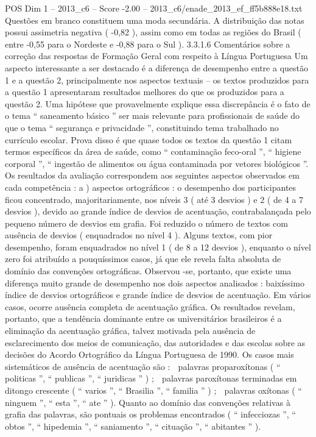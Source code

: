 \begin{textsample}{POS Dim 1 – 2013\_c6 – Score -2.00 – 2013\_c6/enade\_2013\_ef\_ff5b888e18.txt}
Questões em branco constituem uma moda secundária.
A distribuição das notas possui assimetria negativa ( -0,82 ), assim como em todas as regiões do Brasil ( entre -0,55 para o Nordeste e -0,88 para o Sul ). 3.3.1.6 Comentários sobre a correção das respostas de Formação Geral com respeito à Língua Portuguesa Um aspecto interessante a ser destacado é a diferença de desempenho entre a questão 1 e a questão 2, principalmente nos aspectos textuais – os textos produzidos para a questão 1 apresentaram resultados melhores do que os produzidos para a questão 2.
Uma hipótese que provavelmente explique essa discrepância é o fato de o tema “ saneamento básico ” ser mais relevante para profissionais de saúde do que o tema “ segurança e privacidade ”, constituindo tema trabalhado no currículo escolar.
Prova disso é que quase todos os textos da questão 1 citam termos específicos da área de saúde, como “ contaminação feco-oral ”, “ higiene corporal ”, “ ingestão de alimentos ou água contaminada por vetores biológicos ”.
Os resultados da avaliação correspondem aos seguintes aspectos observados em cada competência : a ) aspectos ortográficos : o desempenho dos participantes ficou concentrado, majoritariamente, nos níveis 3 ( até 3 desvios ) e 2 ( de 4 a 7 desvios ), devido ao grande índice de desvios de acentuação, contrabalançada pelo pequeno número de desvios em grafia.
Foi reduzido o número de textos com ausência de desvios ( enquadrados no nível 4 ).
Alguns textos, com pior desempenho, foram enquadrados no nível 1 ( de 8 a 12 desvios ), enquanto o nível zero foi atribuído a pouquíssimos casos, já que ele revela falta absoluta de domínio das convenções ortográficas.
Observou -se, portanto, que existe uma diferença muito grande de desempenho nos dois aspectos analisados : baixíssimo índice de desvios ortográficos e grande índice de desvios de acentuação.
Em vários casos, ocorre ausência completa de acentuação gráfica.
Os resultados revelam, portanto, que a tendência dominante entre os universitários brasileiros é a eliminação da acentuação gráfica, talvez motivada pela ausência de esclarecimento dos meios de comunicação, das autoridades e das escolas sobre as decisões do Acordo Ortográfico da Língua Portuguesa de 1990.
Os casos mais sistemáticos de ausência de acentuação são :  palavras proparoxítonas ( “ politicas ”, “ publicas ”, “ juridicas ” ) ;  palavras paroxítonas terminadas em ditongo crescente ( “ varios ”, “ Brasilia ”, “ familia ” ) ;  palavras oxítonas ( “ ninguem ”, “ esta ”, “ ate ” ).
Quanto ao domínio das convenções relativas à grafia das palavras, são pontuais os problemas encontrados ( “ infecciozas ”, “ obtos ”, “ hipedemia ”, “ saniamento ”, “ cituação ”, “ abitantes ” ).

\end{textsample}
